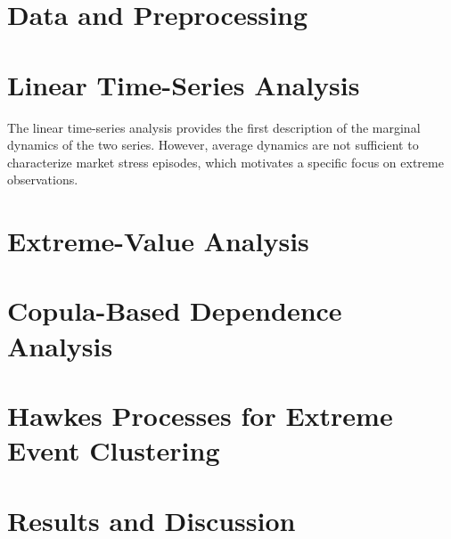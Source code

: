 \documentclass[11pt, a4paper]{article}
\theoremstyle{remark}
\begin{document}
\section{Data and Preprocessing}
\label{sec:data}


\section{Linear Time-Series Analysis}
\label{sec:timeseries}


The linear time-series analysis provides the first description of the marginal dynamics of the two series. However, average dynamics are not sufficient to characterize market stress episodes, which motivates a specific focus on extreme observations.

\section{Extreme-Value Analysis}
\label{sec:extremes}



\section{Copula-Based Dependence Analysis}
\label{sec:copulas}


\section{Hawkes Processes for Extreme Event Clustering}
\label{sec:hawkes}


\section{Results and Discussion}
\label{sec:results}

\end{document}
